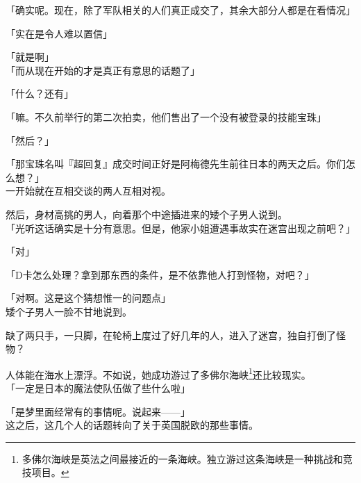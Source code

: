 「确实呢。现在，除了军队相关的人们真正成交了，其余大部分人都是在看情况」

「实在是令人难以置信」

「就是啊」\\

「而从现在开始的才是真正有意思的话题了」

「什么？还有」

「嘛。不久前举行的第二次拍卖，他们售出了一个没有被登录的技能宝珠」

「然后？」

「那宝珠名叫『超回复』成交时间正好是阿梅德先生前往日本的两天之后。你们怎么想？」\\

一开始就在互相交谈的两人互相对视。

然后，身材高挑的男人，向着那个中途插进来的矮个子男人说到。\\

「光听这话确实是十分有意思。但是，他家小姐遭遇事故实在迷宫出现之前吧？」

「对」

「D卡怎么处理？拿到那东西的条件，是不依靠他人打到怪物，对吧？」

「对啊。这是这个猜想惟一的问题点」\\

矮个子男人一脸不甘地说到。

缺了两只手，一只脚，在轮椅上度过了好几年的人，进入了迷宫，独自打倒了怪物？

人体能在海水上漂浮。不如说，她成功游过了多佛尔海峡\footnote{多佛尔海峡是英法之间最接近的一条海峡。独立游过这条海峡是一种挑战和竞技项目。}还比较现实。\\

「一定是日本的魔法使队伍做了些什么啦」

「是梦里面经常有的事情呢。说起来——」\\

这之后，这几个人的话题转向了关于英国脱欧的那些事情。\\
